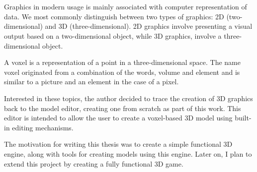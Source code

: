 \chapter*{}
 

Graphics in modern usage is mainly associated with computer representation of data.
We most commonly distinguish between two types of graphics: 2D (two-dimensional)
and 3D (three-dimensional). 2D graphics involve presenting a visual output based on a
two-dimensional object, while 3D graphics, involve a three-dimensional object.

A voxel is a representation of a point in a three-dimensional space. The name voxel originated from a combination of the words, volume and element and is similar to a picture and an element in the case of a pixel.

Interested in these topics, the author decided to trace the creation of 3D graphics back
to the model editor, creating one from scratch as part of this work. This editor is intended to allow the user to create a voxel-based 3D model using built-in editing mechanisms.

The motivation for writing this thesis was to create a simple functional 3D engine,
along with tools for creating models using this engine. Later on, I plan to extend this project by creating a fully functional 3D game.